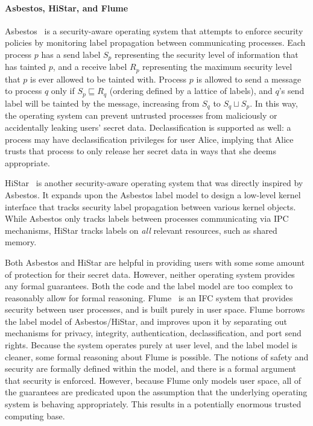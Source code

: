 \ifextended
\paragraph{Asbestos, HiStar, and Flume}
Asbestos~\cite{asbestos} is a security-aware operating system that
attempts to enforce security policies by monitoring label propagation
between communicating processes. Each process $p$ has a send label $S_p$ 
representing the security level of information that has tainted $p$, and
a receive label $R_p$ representing the maximum security level that
$p$ is ever allowed to be tainted with. Process $p$ is allowed
to send a message to process $q$ only if $S_p \sqsubseteq R_q$
(ordering defined by a lattice of labels), and $q$'s send label
will be tainted by the message, increasing from $S_q$ to
$S_q \sqcup S_p$. In this way, the operating system can prevent
untrusted processes from maliciously or accidentally leaking users' 
secret data. Declassification is supported as well: a process
may have declassification privileges for user Alice, implying that
Alice trusts that process to only release her secret data in
ways that she deems appropriate.

HiStar~\cite{histar} is another security-aware operating system 
that was directly inspired by Asbestos. It expands upon the
Asbestos label model to design a low-level kernel interface
that tracks security label propagation between various kernel
objects. While Asbestos only tracks labels between
processes communicating via IPC mechanisms, HiStar tracks labels
on \emph{all} relevant resources, such as shared memory.

Both Asbestos and HiStar are helpful in providing users with
some some amount of protection for their secret data. However,
neither operating system provides any formal guarantees. Both
the code and the label model are too complex to reasonably allow
for formal reasoning. Flume~\cite{flume} is an IFC system
that provides security between user processes, and is built
purely in user space. Flume borrows the label model of
Asbestos/HiStar, and improves upon it by separating out
mechanisms for privacy, integrity, authentication, declassification,
and port send rights. Because the system operates purely at
user level, and the label model is cleaner, some formal reasoning
about Flume is possible. The notions of safety and security are
formally defined within the model, and there is a formal
argument that security is enforced. However, because Flume only
models user space, all of the guarantees are predicated 
upon the assumption that the underlying operating system is
behaving appropriately. This results in a potentially enormous
trusted computing base.

